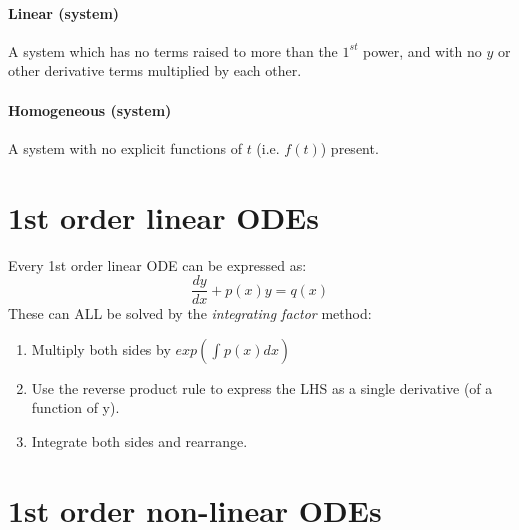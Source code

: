 \documentclass{scrartcl}
\begin{document}
\paragraph{Linear (system)}
A system which has no terms raised to more than the $ 1^{st} $ power, and with no $ y $ or other derivative terms multiplied by each other.

\paragraph{Homogeneous (system)}
A system with no explicit functions of $ t $ (i.e. $ f(t) $) present.
    
\section{1st order linear ODEs}
Every 1st order linear ODE can be expressed as:
\begin{equation}
\frac{dy}{dx} + p(x)y = q(x)
\end{equation}
These can ALL be solved by the \emph{integrating factor} method:
\begin{enumerate}
\item Multiply both sides by $ exp(\int_{}^{} p(x) dx) $
\item Use the reverse product rule to express the LHS as a single derivative (of a function of y).
\item Integrate both sides and rearrange.
\end{enumerate}
  
\section{1st order non-linear ODEs}
\end{document}
